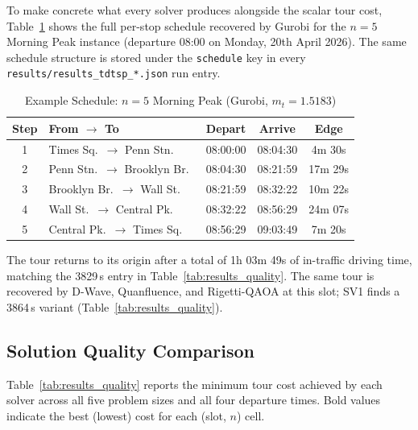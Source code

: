 \documentclass[conference]{IEEEtran}
\begin{document}
To make concrete what every solver produces alongside the scalar tour cost, Table~\ref{tab:schedule_example} shows the full per-stop schedule recovered by Gurobi for the $n=5$ Morning Peak instance (departure 08:00 on Monday, 20th April 2026). The same schedule structure is stored under the \texttt{schedule} key in every \texttt{results/results\_tdtsp\_*.json} run entry.

\begin{table}[htbp]
\caption{Example Schedule: $n=5$ Morning Peak (Gurobi, $m_t{=}1.5183$)}
\begin{center}
\begin{tabular}{|c|l|c|c|c|}
\hline
\textbf{Step} & \textbf{From $\rightarrow$ To} & \textbf{Depart} & \textbf{Arrive} & \textbf{Edge} \\
\hline
1 & Times Sq.\ $\rightarrow$ Penn Stn.\    & 08:00:00 & 08:04:30 & 4m 30s  \\
\hline
2 & Penn Stn.\ $\rightarrow$ Brooklyn Br.\ & 08:04:30 & 08:21:59 & 17m 29s \\
\hline
3 & Brooklyn Br.\ $\rightarrow$ Wall St.\  & 08:21:59 & 08:32:22 & 10m 22s \\
\hline
4 & Wall St.\ $\rightarrow$ Central Pk.\   & 08:32:22 & 08:56:29 & 24m 07s \\
\hline
5 & Central Pk.\ $\rightarrow$ Times Sq.\  & 08:56:29 & 09:03:49 & 7m 20s  \\
\hline
\end{tabular}
\label{tab:schedule_example}
\end{center}
\end{table}

The tour returns to its origin after a total of 1h 03m 49s of in-traffic driving time, matching the 3829\,s entry in Table~\ref{tab:results_quality}. The same tour is recovered by D-Wave, Quanfluence, and Rigetti-QAOA at this slot; SV1 finds a 3864\,s variant (Table~\ref{tab:results_quality}).

\subsection{Solution Quality Comparison}

Table~\ref{tab:results_quality} reports the minimum tour cost achieved by each solver across all five problem sizes and all four departure times. Bold values indicate the best (lowest) cost for each (slot, $n$) cell. 

\end{document}
